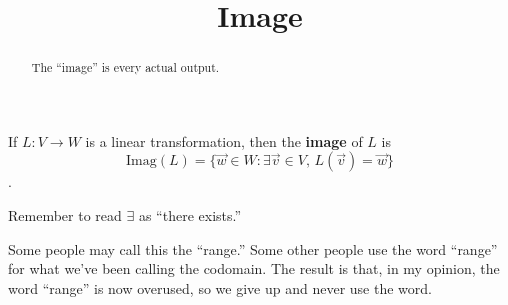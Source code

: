 \documentclass{ximera}
\title{Image}
\begin{document}
\begin{abstract}
  The ``image'' is every actual output.
\end{abstract}

\begin{definition}
  If $L:V \to W$ is a linear transformation, then the \textbf{image}
  of $L$ is $$\text{Imag}(L) = \{\vec{w} \in W: \exists \vec{v} \in V,\, L(\vec{v}) = \vec{w}\}$$.
\end{definition}

Remember to read $\exists$ as ``there exists.''

\begin{warning}
  Some people may call this the ``range.''  Some other people use the
  word ``range'' for what we've been calling the codomain.  The result
  is that, in my opinion, the word ``range'' is now overused, so we
  give up and never use the word.
\end{warning}
\end{document}
